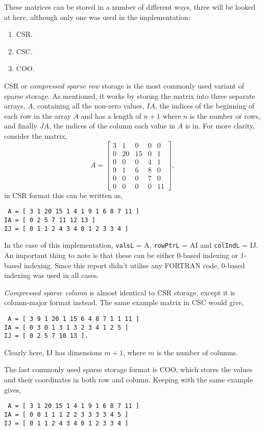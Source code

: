 These matrices can be stored in a number of different ways, three will be looked at here, although only one was used in the implementation:
\begin{enumerate}
	\item CSR.
	\item CSC.
	\item COO.
\end{enumerate}
CSR or \textit{compressed sparse row} storage is the most commonly used variant of sparse storage. As mentioned, it works by storing the matrix into three separate arrays, $A$, containing all the non-zero values, $IA$, the indices of the beginning of each row in the array $A$ and has a length of $n+1$ where $n$ is the number or rows, and finally $JA$, the indices of the column each value in $A$ is in. For more clarity, consider the matrix,
\begin{equation}
	A = 
	\left[\begin{matrix}
		3 & 1 & 0 & 0 & 0\\
		0 & 20 & 15 & 0 & 1\\
		0 & 0 & 0 & 4 & 1\\
		9 & 1 & 6 & 8 & 0\\
		0 & 0 & 0 & 7 & 0\\
		0 & 0 & 0 & 0 & 11
	\end{matrix}\right],
\end{equation}
in CSR format this can be written as,
\begin{lstlisting}
 A = [ 3 1 20 15 1 4 1 9 1 6 8 7 11 ]
IA = [ 0 2 5 7 11 12 13 ]
IJ = [ 0 1 1 2 4 3 4 0 1 2 3 3 4 ]
\end{lstlisting}
In the case of this implementation, \texttt{valsL} = A, \texttt{rowPtrL} = AI and \texttt{colIndL} = IJ. An important thing to note is that these can be either 0-based indexing or 1-based indexing. Since this report didn't utilise any FORTRAN code, 0-based indexing was used in all cases.

\textit{Compressed sparse column} is almost identical to CSR storage, except it is column-major format instead. The same example matrix in CSC would give,
\begin{lstlisting}
 A = [ 3 9 1 20 1 15 6 4 8 7 1 1 11 ]
IA = [ 0 3 0 1 3 1 3 2 3 4 1 2 5 ]
IJ = [ 0 2 5 7 10 13 ].
\end{lstlisting}
Clearly here, IJ has dimensions $m+1$, where $m$ is the number of columns.

The last commonly used sparse storage format is COO, which stores the values and their coordinates in both row and column. Keeping with the same example gives,
\begin{lstlisting}
 A = [ 3 1 20 15 1 4 1 9 1 6 8 7 11 ]
IA = [ 0 0 1 1 1 2 2 3 3 3 3 4 5 ]
IJ = [ 0 1 1 2 4 3 4 0 1 2 3 3 4 ]
\end{lstlisting}
